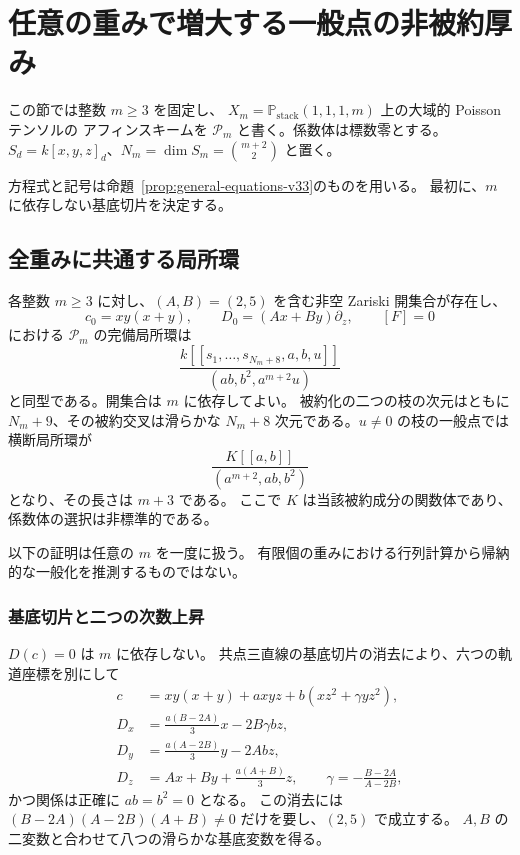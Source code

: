 \section{任意の重みで増大する一般点の非被約厚み}
\label{sec:all-weights-concurrent-v33}

この節では整数 $m\geq3$ を固定し、
$X_m=\mathbb P_{\mathrm{stack}}(1,1,1,m)$ 上の大域的 Poisson テンソルの
アフィンスキームを $\mathscr P_m$ と書く。係数体は標数零とする。
$S_d=k[x,y,z]_d$、$N_m=\dim S_m=\binom{m+2}{2}$ と置く。

方程式と記号は命題~\ref{prop:general-equations-v33}のものを用いる。
最初に、$m$ に依存しない基底切片を決定する。


\subsection{全重みに共通する局所環}

\begin{theorem}[一般点の厚み $m+3$]
\label{thm:allm-concurrent-v33}
各整数 $m\geq3$ に対し、$(A,B)=(2,5)$ を含む非空 Zariski 開集合が存在し、
\[
 c_0=xy(x+y),\qquad D_0=(Ax+By)\partial_z,\qquad [F]=0
\]
における $\mathscr P_m$ の完備局所環は
\[
 \boxed{\quad
 \frac{k[[s_1,\ldots,s_{N_m+8},a,b,u]]}
 {(ab,b^2,a^{m+2}u)}
 \quad}
\]
と同型である。開集合は $m$ に依存してよい。
被約化の二つの枝の次元はともに $N_m+9$、その被約交叉は滑らかな
$N_m+8$ 次元である。$u\ne0$ の枝の一般点では横断局所環が
\[
 \frac{K[[a,b]]}{(a^{m+2},ab,b^2)}
\]
となり、その長さは $m+3$ である。
ここで $K$ は当該被約成分の関数体であり、係数体の選択は非標準的である。
\end{theorem}

以下の証明は任意の $m$ を一度に扱う。
有限個の重みにおける行列計算から帰納的な一般化を推測するものではない。

\subsubsection*{基底切片と二つの次数上昇}

$D(c)=0$ は $m$ に依存しない。
共点三直線の基底切片の消去により、六つの軌道座標を別にして
\begin{align*}
 c&=xy(x+y)+a xyz+b(xz^2+\gamma yz^2),\\
 D_x&=\frac{a(B-2A)}3x-2B\gamma bz,\\
 D_y&=\frac{a(A-2B)}3y-2Abz,\\
 D_z&=Ax+By+\frac{a(A+B)}3z,\qquad
 \gamma=-\frac{B-2A}{A-2B},
\end{align*}
かつ関係は正確に $ab=b^2=0$ となる。
この消去には $(B-2A)(A-2B)(A+B)\ne0$ だけを要し、$(2,5)$ で成立する。
$A,B$ の二変数と合わせて八つの滑らかな基底変数を得る。

